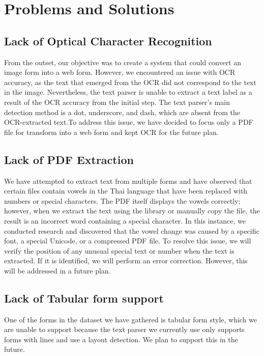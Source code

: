 \documentclass[12pt,oneside,openright,a4paper]{cpe-english-project}
\begin{document}
\section{Problems and Solutions}

\subsection{Lack of Optical Character Recognition}

From the outset, our objective was to create a system that could convert an image form into a web form. However, we encountered an issue with OCR accuracy, as the text that emerged from the OCR did not correspond to the text in the image. Nevertheless, the text parser is unable to extract a text label as a result of the OCR accuracy from the initial step. The text parser's main detection method is a dot, underscore, and dash, which are absent from the OCR-extracted text.To address this issue, we have decided to focus only a PDF file for transform into a web form and kept OCR for the future plan.

\subsection{Lack of PDF Extraction}

We have attempted to extract text from multiple forms and have observed that certain files contain vowels in the Thai language that have been replaced with numbers or special characters. The PDF itself displays the vowels correctly; however, when we extract the text using the library or manually copy the file, the result is an incorrect word containing a special character. In this instance, we conducted research and discovered that the vowel change was caused by a specific font, a special Unicode, or a compressed PDF file. To resolve this issue, we will verify the position of any unusual special text or number when the text is extracted. If it is identified, we will perform an error correction. However, this will be addressed in a future plan.

\subsection{Lack of Tabular form support}

One of the forms in the dataset we have gathered is tabular form style, which we are unable to support because the text parser we currently use only supports forms with lines and use a layout detection. We plan to support this in the future.
\end{document}
